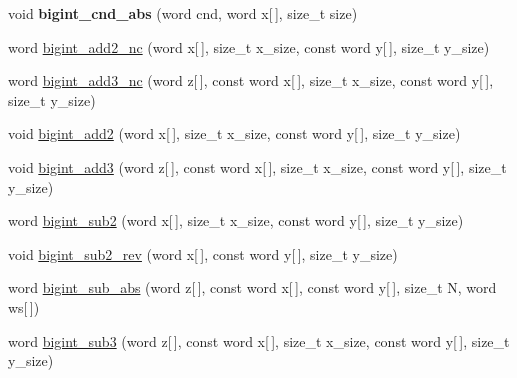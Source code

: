 \begin{DoxyCompactItemize}
\item 
\mbox{\label{namespace_botan_ae189b06d3f78a38ff6f91241f3e51cdf}} 
void {\bfseries bigint\+\_\+cnd\+\_\+abs} (word cnd, word x\mbox{[}$\,$\mbox{]}, size\+\_\+t size)
\item 
word \mbox{\hyperlink{namespace_botan_ab8f4a27c1c5bf03f1a8dab57f2a41a13}{bigint\+\_\+add2\+\_\+nc}} (word x\mbox{[}$\,$\mbox{]}, size\+\_\+t x\+\_\+size, const word y\mbox{[}$\,$\mbox{]}, size\+\_\+t y\+\_\+size)
\item 
word \mbox{\hyperlink{namespace_botan_ac6b0c61acfab2f864b2cf3999ca76c01}{bigint\+\_\+add3\+\_\+nc}} (word z\mbox{[}$\,$\mbox{]}, const word x\mbox{[}$\,$\mbox{]}, size\+\_\+t x\+\_\+size, const word y\mbox{[}$\,$\mbox{]}, size\+\_\+t y\+\_\+size)
\item 
void \mbox{\hyperlink{namespace_botan_a909ae118a4227e2c3b1d6dac8cde629c}{bigint\+\_\+add2}} (word x\mbox{[}$\,$\mbox{]}, size\+\_\+t x\+\_\+size, const word y\mbox{[}$\,$\mbox{]}, size\+\_\+t y\+\_\+size)
\item 
void \mbox{\hyperlink{namespace_botan_a2b90c82b13db8553eaa2701a8dd5975f}{bigint\+\_\+add3}} (word z\mbox{[}$\,$\mbox{]}, const word x\mbox{[}$\,$\mbox{]}, size\+\_\+t x\+\_\+size, const word y\mbox{[}$\,$\mbox{]}, size\+\_\+t y\+\_\+size)
\item 
word \mbox{\hyperlink{namespace_botan_a1d2b962eb5d832116befc5957a6c975e}{bigint\+\_\+sub2}} (word x\mbox{[}$\,$\mbox{]}, size\+\_\+t x\+\_\+size, const word y\mbox{[}$\,$\mbox{]}, size\+\_\+t y\+\_\+size)
\item 
void \mbox{\hyperlink{namespace_botan_a108c3a5b46712583de64a39d5fa6841b}{bigint\+\_\+sub2\+\_\+rev}} (word x\mbox{[}$\,$\mbox{]}, const word y\mbox{[}$\,$\mbox{]}, size\+\_\+t y\+\_\+size)
\item 
word \mbox{\hyperlink{namespace_botan_a8ea10868dfcff0fcf7e44adc40192908}{bigint\+\_\+sub\+\_\+abs}} (word z\mbox{[}$\,$\mbox{]}, const word x\mbox{[}$\,$\mbox{]}, const word y\mbox{[}$\,$\mbox{]}, size\+\_\+t N, word ws\mbox{[}$\,$\mbox{]})
\item 
word \mbox{\hyperlink{namespace_botan_aecdda04dbd8f4ec5aab85af9983e9c7a}{bigint\+\_\+sub3}} (word z\mbox{[}$\,$\mbox{]}, const word x\mbox{[}$\,$\mbox{]}, size\+\_\+t x\+\_\+size, const word y\mbox{[}$\,$\mbox{]}, size\+\_\+t y\+\_\+size)
\item 
\mbox{\label{namespace_botan_adaae60574552cb9732a25e7dc343b31d}} 

\end{DoxyCompactItemize}
